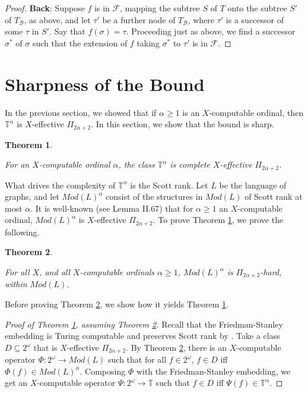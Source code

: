 \documentclass{article}
\newtheorem{thm}{Theorem}[section]
\begin{document}
\begin{proof}
\bigskip
\noindent
\textbf{Back}:  Suppose $f$ is in $\mathcal{F}$, mapping the subtree $S$ of $T$ onto the subtree $S'$ of $T_\mathcal{B}$, as above, and let $\tau'$ be a further node of $T_\mathcal{B}$, where $\tau'$ is a successor of some $\tau$ in $S'$. Say that $f(\sigma) = \tau$.  Proceeding just as above, we find a successor $\sigma^*$ of $\sigma$ such that the extension of $f$ taking $\sigma^*$ to $\tau'$ is in $\mathcal{F}$.  
\end{proof}  


\section{Sharpness of the Bound}

In the previous section, we showed that if $\alpha\geq 1$ is an $X$-computable ordinal, then $\mathbb{T}^\alpha$ is $X$-effective $\Pi_{2\alpha+2}$.  In this section, we show that the bound is sharp.  

\begin{thm}\label{thm:sharpness}

For an $X$-computable ordinal $\alpha$, the class $\mathbb{T}^\alpha$ is complete $X$-effective $\Pi_{2\alpha+2}$.

\end{thm}

What drives the complexity of $\mathbb{T}^\alpha$ is the Scott rank.  Let $L$ be the language of graphs, and let $Mod(L)^\alpha$ consist of the structures in $Mod(L)$ of Scott rank at most $\alpha$.  It is well-known (see \cite{Mbook2} Lemma II.67) that for $\alpha\geq 1$ an $X$-computable ordinal, $Mod(L)^\alpha$ is $X$-effective $\Pi_{2\alpha+2}$.  To prove Theorem \ref{thm:sharpness}, we prove the following.

\begin{thm}
\label{Mod(L)}

For all $X$, and all $X$-computable ordinals $\alpha\geq 1$, $Mod(L)^\alpha$ is $\Pi_{2\alpha+2}$-hard, within $Mod(L)$.  

\end{thm}

Before proving Theorem \ref{Mod(L)}, we show how it yields Theorem \ref{thm:sharpness}.

\begin{proof} [Proof of Theorem \ref{thm:sharpness}, assuming Theorem \ref{Mod(L)}]

Recall that the Friedman-Stanley embedding is Turing computable and preserves Scott rank by \cite{GR}.  Take a class $D\subseteq 2^\omega$ that is $X$-effective $\Pi_{2\alpha+2}$.  By Theorem \ref{Mod(L)}, there is an $X$-computable operator $\Phi:2^\omega\rightarrow Mod(L)$ such that  for all $f\in 2^\omega$, $f\in D$ iff $\Phi(f)\in Mod(L)^\alpha$.  Composing $\Phi$ with the Friedman-Stanley embedding, we get an $X$-computable operator $\Psi:2^\omega\rightarrow\mathbb{T}$ such that $f\in D$ iff $\Psi(f)\in \mathbb{T}^\alpha$.  
\end{proof}    
\end{document}
